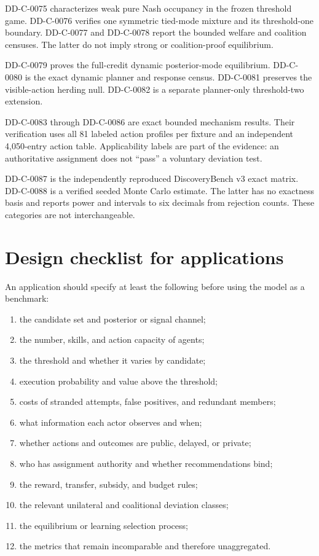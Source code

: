 \documentclass[11pt]{article}
\begin{document}
DD-C-0075 characterizes weak pure Nash occupancy in the frozen threshold game.
DD-C-0076 verifies one symmetric tied-mode mixture and its threshold-one
boundary. DD-C-0077 and DD-C-0078 report the bounded welfare and coalition
censuses. The latter do not imply strong or coalition-proof equilibrium.

DD-C-0079 proves the full-credit dynamic posterior-mode equilibrium. DD-C-0080
is the exact dynamic planner and response census. DD-C-0081 preserves the
visible-action herding null. DD-C-0082 is a separate planner-only threshold-two
extension.

DD-C-0083 through DD-C-0086 are exact bounded mechanism results. Their
verification uses all 81 labeled action profiles per fixture and an independent
4,050-entry action table. Applicability labels are part of the evidence: an
authoritative assignment does not ``pass'' a voluntary deviation test.

DD-C-0087 is the independently reproduced DiscoveryBench v3 exact matrix.
DD-C-0088 is a verified seeded Monte Carlo estimate. The latter has no
exactness basis and reports power and intervals to six decimals from rejection
counts. These categories are not interchangeable.

\section{Design checklist for applications}

An application should specify at least the following before using the model as
a benchmark:
\begin{enumerate}[leftmargin=2em]
\item the candidate set and posterior or signal channel;
\item the number, skills, and action capacity of agents;
\item the threshold and whether it varies by candidate;
\item execution probability and value above the threshold;
\item costs of stranded attempts, false positives, and redundant members;
\item what information each actor observes and when;
\item whether actions and outcomes are public, delayed, or private;
\item who has assignment authority and whether recommendations bind;
\item the reward, transfer, subsidy, and budget rules;
\item the relevant unilateral and coalitional deviation classes;
\item the equilibrium or learning selection process;
\item the metrics that remain incomparable and therefore unaggregated.
\end{enumerate}
\end{document}
